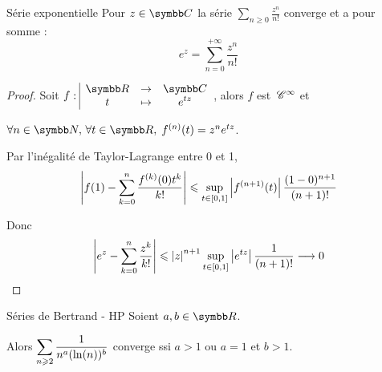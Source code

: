 \begin{proposition}{Série exponentielle}{}
    Pour $z \in \C$ la série $\sum_{n \geqslant 0} \frac{z^n}{n!}$ converge et a pour somme :
    \[e^z = \sum_{n = 0}^{+\infty} \frac{z^n}{n!}\]
\end{proposition}


\begin{proof}
    Soit $\fonction f \R \C t {e^{tz}}$, alors $f$ est $\,\mathscr C^{\infty}$ et 
    
    $\forall n \in \N, \, \forall t \in \R, \; f^{(n)}(t) = z^n e^{tz}$.

    Par l'inégalité de Taylor-Lagrange entre 0 et 1, 
    \[\left|f(1) - \sum_{k = 0}^{n} \frac{f^{(k)}(0)t^k}{k!}\right| \leqslant \sup_{t \in [0, 1]}\left|f^{(n + 1)}(t)\right| \frac{(1 - 0)^{n + 1}}{(n + 1)!}\]

    Donc 
    \[\left|e^z - \sum_{k = 0 }^{n}\frac{z^k}{k!}\right| \leqslant \left|z\right|^{n+1} \sup_{t \in [0, 1]} \left|e^{tz}\right| \frac{1}{(n + 1)!} \longrightarrow 0\]
\end{proof}

\begin{proposition}{Séries de Bertrand - HP}{}
    Soient $a, b \in \R$. 

    Alors $\displaystyle \sum_{n \geqslant 2} \frac 1 {n^a(\ln(n))^b}$ converge ssi $a > 1$ ou $a = 1$ et $b > 1$.
\end{proposition}


